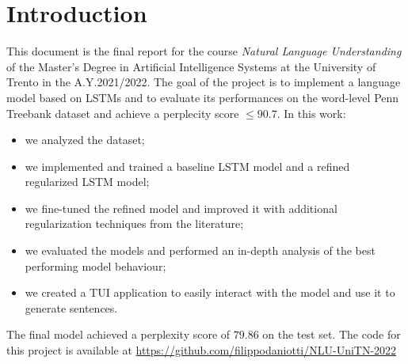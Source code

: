 \section{Introduction}
This document is the final report for the course \emph{Natural Language Understanding} of the Master's Degree in Artificial Intelligence Systems at the University of Trento in the A.Y.2021/2022. The goal of the project is to implement a language model based on LSTMs\cite{hochreiter1997lstm} and to evaluate its performances on the word-level Penn Treebank\cite{marcus1993building} dataset and achieve a perplecity score $\le 90.7$. In this work:
\begin{itemize}
    \item we analyzed the dataset;
    \item we implemented and trained a baseline LSTM model and a refined regularized LSTM model;
    \item we fine-tuned the refined model and improved it with additional regularization techniques from the literature;
    \item we evaluated the models and performed an in-depth analysis of the best performing model behaviour;
    \item we created a TUI application to easily interact with the model and use it to generate sentences.
\end{itemize}
The final model achieved a perplexity score of $79.86$ on the test set. The code for this project is available at \url{https://github.com/filippodaniotti/NLU-UniTN-2022}